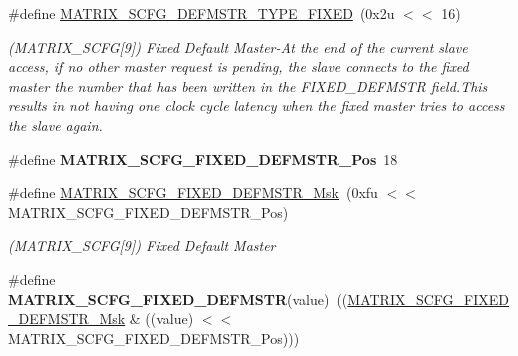 \begin{DoxyCompactItemize}
\mbox{\label{group__SAME70__MATRIX_ga8d89957356611bdf1a256db82a84c465}} 
\#define \mbox{\hyperlink{group__SAME70__MATRIX_ga8d89957356611bdf1a256db82a84c465}{M\+A\+T\+R\+I\+X\+\_\+\+S\+C\+F\+G\+\_\+\+D\+E\+F\+M\+S\+T\+R\+\_\+\+T\+Y\+P\+E\+\_\+\+F\+I\+X\+ED}}~(0x2u $<$$<$ 16)
\begin{DoxyCompactList}\small\item\em (M\+A\+T\+R\+I\+X\+\_\+\+S\+C\+FG\mbox{[}9\mbox{]}) Fixed Default Master-\/\+At the end of the current slave access, if no other master request is pending, the slave connects to the fixed master the number that has been written in the F\+I\+X\+E\+D\+\_\+\+D\+E\+F\+M\+S\+TR field.\+This results in not having one clock cycle latency when the fixed master tries to access the slave again. \end{DoxyCompactList}\item 
\mbox{\label{group__SAME70__MATRIX_ga7bf8c13ca20168061abe83d20ee4aaa4}} 
\#define {\bfseries M\+A\+T\+R\+I\+X\+\_\+\+S\+C\+F\+G\+\_\+\+F\+I\+X\+E\+D\+\_\+\+D\+E\+F\+M\+S\+T\+R\+\_\+\+Pos}~18
\item 
\mbox{\label{group__SAME70__MATRIX_gaf1a2cf87724c9cc01ba7745ced4d4a29}} 
\#define \mbox{\hyperlink{group__SAME70__MATRIX_gaf1a2cf87724c9cc01ba7745ced4d4a29}{M\+A\+T\+R\+I\+X\+\_\+\+S\+C\+F\+G\+\_\+\+F\+I\+X\+E\+D\+\_\+\+D\+E\+F\+M\+S\+T\+R\+\_\+\+Msk}}~(0xfu $<$$<$ M\+A\+T\+R\+I\+X\+\_\+\+S\+C\+F\+G\+\_\+\+F\+I\+X\+E\+D\+\_\+\+D\+E\+F\+M\+S\+T\+R\+\_\+\+Pos)
\begin{DoxyCompactList}\small\item\em (M\+A\+T\+R\+I\+X\+\_\+\+S\+C\+FG\mbox{[}9\mbox{]}) Fixed Default Master \end{DoxyCompactList}\item 
\mbox{\label{group__SAME70__MATRIX_ga5f96e7339f9cb48e52291ef59a619ad1}} 
\#define {\bfseries M\+A\+T\+R\+I\+X\+\_\+\+S\+C\+F\+G\+\_\+\+F\+I\+X\+E\+D\+\_\+\+D\+E\+F\+M\+S\+TR}(value)~((\mbox{\hyperlink{group__SAMV71__MATRIX_gaf1a2cf87724c9cc01ba7745ced4d4a29}{M\+A\+T\+R\+I\+X\+\_\+\+S\+C\+F\+G\+\_\+\+F\+I\+X\+E\+D\+\_\+\+D\+E\+F\+M\+S\+T\+R\+\_\+\+Msk}} \& ((value) $<$$<$ M\+A\+T\+R\+I\+X\+\_\+\+S\+C\+F\+G\+\_\+\+F\+I\+X\+E\+D\+\_\+\+D\+E\+F\+M\+S\+T\+R\+\_\+\+Pos)))
\item 
\mbox{\label{group__SAME70__MATRIX_gaf4eb749b4f287949fd3478c4eb762318}} 
$$
\end{DoxyCompactItemize}
